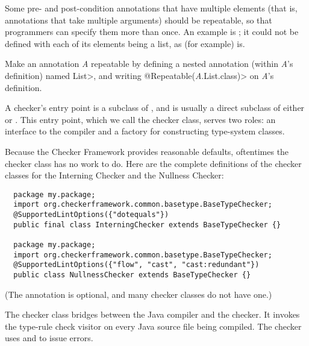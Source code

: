 
Some pre- and post-condition annotations that have multiple elements (that
is, annotations that take multiple arguments) should be repeatable, so that
programmers can specify them more than once.  An example is
; it could not be
defined with each of its elements being a list, as (for example)
 is.

Make an annotation \emph{A} repeatable by defining a nested annotation (within
\emph{A}'s definition) named \<List>, and writing
\<@Repeatable(\emph{A}.List.class)> on \emph{A}'s definition.



A checker's entry point is a subclass of
, and is usually a direct subclass
of either  or
.
This entry
point, which we call the checker class, serves two
roles:  an interface to the compiler and a factory for constructing
type-system classes.

Because the Checker Framework provides reasonable defaults, oftentimes the
checker class has no work to do.  Here are the complete definitions of the
checker classes for the Interning Checker and the Nullness Checker:

\begin{Verbatim}
  package my.package;
  import org.checkerframework.common.basetype.BaseTypeChecker;
  @SupportedLintOptions({"dotequals"})
  public final class InterningChecker extends BaseTypeChecker {}

  package my.package;
  import org.checkerframework.common.basetype.BaseTypeChecker;
  @SupportedLintOptions({"flow", "cast", "cast:redundant"})
  public class NullnessChecker extends BaseTypeChecker {}
\end{Verbatim}

(The  annotation is
optional, and many checker classes do not have one.)

The checker class bridges between the Java compiler and the checker.  It
invokes the type-rule check visitor on every Java source file being
compiled.  The checker uses
and
to issue errors.

